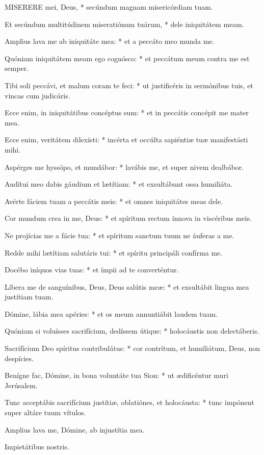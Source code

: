 
\lettrine[lines=2]{M}{ISERERE} mei, Deus, * secúndum magnam misericórdiam tuam.

Et secúndum multitúdinem miseratiónum tuárum, * dele iniquitátem meam.

Amplius lava me ab iniquitáte mea: * et a peccáto meo munda me.

Quóniam iniquitátem meam ego cognósco: * et peccátum meum contra me est semper.

Tibi soli peccávi, et malum coram te feci: * ut justificéris in sermónibus tuis, et vincas cum judicáris.

Ecce enim, in iniquitátibus concéptus sum: * et in peccátis concépit me mater mea.

Ecce enim, veritátem dilexísti: * incérta et occúlta sapiéntiæ tuæ manifestásti mihi.

Aspérges me hyssópo, et mundábor: * lavábis me, et super nivem dealbábor.

Audítui meo dabis gáudium et lætítiam: * et exsultábunt ossa humiliáta.

Avérte fáciem tuam a peccátis meis: * et omnes iniquitátes meas dele.

Cor mundum crea in me, Deus: * et spíritum rectum ínnova in viscéribus meis.

Ne projícias me a fácie tua: * et spíritum sanctum tuum ne áuferas a me.

Redde mihi lætítiam salutáris tui: * et spíritu principáli confírma me.

Docébo iníquos vias tuas: * et ímpii ad te converténtur.

Líbera me de sanguínibus, Deus, Deus salútis meæ: * et exsultábit lingua mea justítiam tuam.

Dómine, lábia mea apéries: * et os meum annuntiábit laudem tuam.

Quóniam si voluísses sacrifícium, dedíssem útique: * holocáustis non delectáberis.

Sacrifícium Deo spíritus contribulátus: * cor contrítum, et humiliátum, Deus, non despícies.

Benígne fac, Dómine, in bona voluntáte tua Sion: * ut ædificéntur muri Jerúsalem.

Tunc acceptábis sacrifícium justítiæ, oblatiónes, et holocáusta: * tunc impónent super altáre tuum vítulos.

 Amplius lava me, Dómine, ab injustítia mea.

 Impietátibus nostris.

